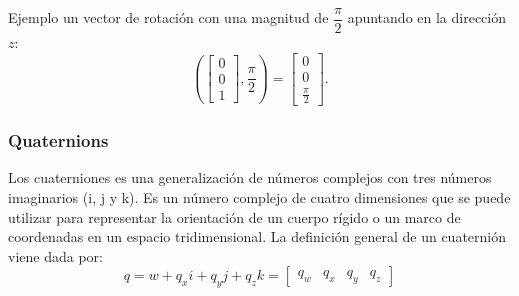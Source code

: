 \begin{frame}
    Ejemplo un vector de rotación con una magnitud de $\dfrac{\pi}{2}$ apuntando en la dirección $z$:
    \begin{equation*}
        {\displaystyle {\left({\begin{bmatrix}0\\0\\1\end{bmatrix}},{\frac {\pi }{2}}\right) = \begin{bmatrix}0\\0\\{\frac {\pi }{2}}\end{bmatrix}}.}
    \end{equation*}


\end{frame}

\begin{frame}
    \frametitle{Quaternions}
    Los cuaterniones es una generalización de números complejos con tres números imaginarios (i, j y k). Es un número complejo de cuatro dimensiones que se puede utilizar para representar la orientación de un cuerpo rígido o un marco de coordenadas en un espacio tridimensional. La definición general de un cuaternión viene dada por:
    \begin{equation*}
        q = w + q_x i + q_y j + q_z k = \begin{bmatrix} q_w & q_x & q_y & q_z\end{bmatrix}
    \end{equation*}
\end{frame}

